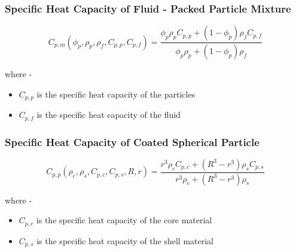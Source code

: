 \documentclass[../main.tex]{subfiles}
\begin{document}
\subsubsection{Specific Heat Capacity of Fluid - Packed Particle Mixture}

\begin{equation}
    C_{p,m} \left( \phi_p, \rho_p, \rho_f, C_{p,p}, C_{p,f} \right) = \frac{ \phi_p \rho_p C_{p,p} + \left( 1 - \phi_p \right) \rho_f C_{p,f} }{ \phi_p \rho_p + \left( 1 - \phi_p \right) \rho_f }
\end{equation}

where - 

\begin{itemize}
    \item $C_{p,p}$ is the specific heat capacity of the particles
    \item $C_{p,f}$ is the specific heat capacity of the fluid
\end{itemize}

\subsubsection{Specific Heat Capacity of Coated Spherical Particle}

\begin{equation}
    C_{p,p} \left( \rho_c, \rho_s, C_{p,c}, C_{p,s}, R, r \right) = \frac{ r^3 \rho_c C_{p,c} + \left(R^3 - r^3\right) \rho_s C_{p,s} }{ r^3 \rho_c + \left(R^3 - r^3\right) \rho_s}
\end{equation}

where -

\begin{itemize}
    \item $C_{p,c}$ is the specific heat capacity of the core material
    \item $C_{p,s}$ is the specific heat capacity of the shell material
\end{itemize}
\end{document}
